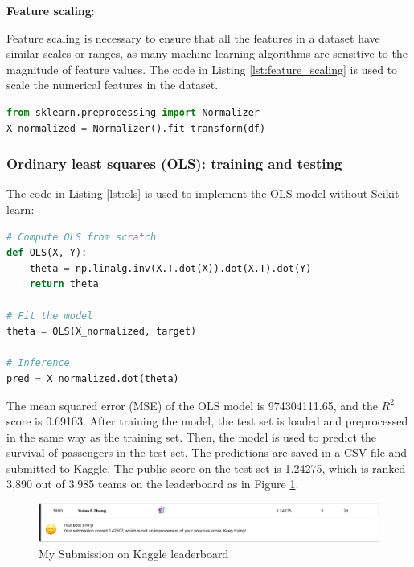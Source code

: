 \documentclass[10pt]{article}
\begin{document}
\textbf{Feature scaling}:

Feature scaling is necessary to ensure that all the features in a dataset have similar scales or ranges, as many machine learning algorithms are sensitive to the magnitude of feature values. The code in Listing \ref{lst:feature_scaling} is used to scale the numerical features in the dataset.

\begin{lstlisting}[language=Python, label={lst:feature_scaling}, caption={Scale the numerical features in the dataset}]
from sklearn.preprocessing import Normalizer
X_normalized = Normalizer().fit_transform(df)
\end{lstlisting}

\subsubsection{Ordinary least squares (OLS): training and testing}

The code in Listing \ref{lst:ols} is used to implement the OLS model without Scikit-learn:

\begin{lstlisting}[language=Python, label={lst:ols}, caption={OLS implementation}]
# Compute OLS from scratch
def OLS(X, Y):
    theta = np.linalg.inv(X.T.dot(X)).dot(X.T).dot(Y)
    return theta

# Fit the model
theta = OLS(X_normalized, target)

# Inference
pred = X_normalized.dot(theta)
\end{lstlisting}

The mean squared error (MSE) of the OLS model is 974304111.65, and the \(R^2\) score is 0.69103. After training the model, the test set is loaded and preprocessed in the same way as the training set. Then, the model is used to predict the survival of passengers in the test set. The predictions are saved in a CSV file and submitted to Kaggle. The public score on the test set is 1.24275, which is ranked 3,890 out of 3.985 teams on the leaderboard as in Figure \ref{fig:kaggle_leaderboard_1}.

\begin{figure}[!htbp]
    \centering
    \includegraphics[width=\textwidth]{../hw1/result/Part_I/leaderboard.png}
    \caption{My Submission on Kaggle leaderboard}
    \label{fig:kaggle_leaderboard_1}
\end{figure}
\end{document}
